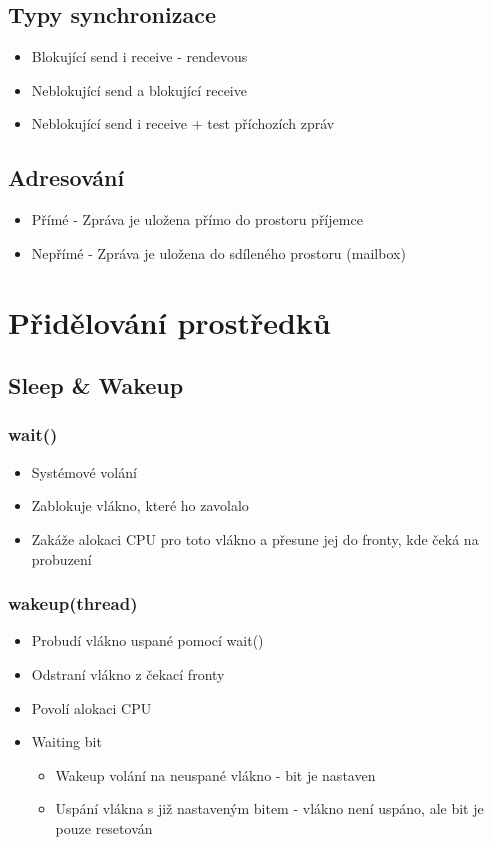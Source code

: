 \documentclass{szzclass}
\begin{document}
\subsection{Typy synchronizace}

\begin{itemize}
\item Blokující send i receive - rendevous
\item Neblokující send a blokující receive
\item Neblokující send i receive + test příchozích zpráv
\end{itemize}

\subsection{Adresování}

\begin{itemize}
\item Přímé - Zpráva je uložena přímo do prostoru příjemce
\item Nepřímé - Zpráva je uložena do sdíleného prostoru (mailbox)
\end{itemize}

\section{Přidělování prostředků}

\subsection{Sleep \& Wakeup}

\subsubsection{wait()}

\begin{itemize}
\item Systémové volání
\item Zablokuje vlákno, které ho zavolalo
\item Zakáže alokaci CPU pro toto vlákno a přesune jej do fronty, kde čeká na probuzení
\end{itemize}

\subsubsection{wakeup(thread)}

\begin{itemize}
\item Probudí vlákno uspané pomocí wait()
\item Odstraní vlákno z čekací fronty
\item Povolí alokaci CPU
\item Waiting bit
\begin{itemize}
    \item Wakeup volání na neuspané vlákno - bit je nastaven
    \item Uspání vlákna s již nastaveným bitem - vlákno není uspáno, ale bit je pouze resetován
\end{itemize}
\end{itemize}
\end{document}
